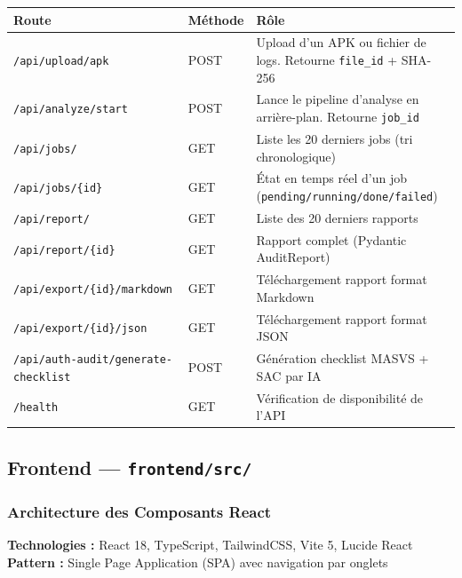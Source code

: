 \documentclass[12pt,a4paper,french]{article}
\newcommand{\file}[1]{\textcolor{primary}{\texttt{#1}}}
\begin{document}
\begin{center}
\renewcommand{\arraystretch}{1.4}
\begin{tabular}{llp{6cm}}
\toprule
\textbf{Route} & \textbf{Méthode} & \textbf{Rôle} \\
\midrule
\rowcolor{primary!5}
\texttt{/api/upload/apk} & POST & Upload d'un APK ou fichier de logs. Retourne \texttt{file\_id} + SHA-256 \\
\texttt{/api/analyze/start} & POST & Lance le pipeline d'analyse en arrière-plan. Retourne \texttt{job\_id} \\
\rowcolor{primary!5}
\texttt{/api/jobs/} & GET & Liste les 20 derniers jobs (tri chronologique) \\
\texttt{/api/jobs/\{id\}} & GET & État en temps réel d'un job (\texttt{pending/running/done/failed}) \\
\rowcolor{primary!5}
\texttt{/api/report/} & GET & Liste des 20 derniers rapports \\
\texttt{/api/report/\{id\}} & GET & Rapport complet (Pydantic AuditReport) \\
\rowcolor{primary!5}
\texttt{/api/export/\{id\}/markdown} & GET & Téléchargement rapport format Markdown \\
\texttt{/api/export/\{id\}/json} & GET & Téléchargement rapport format JSON \\
\rowcolor{primary!5}
\texttt{/api/auth-audit/generate-checklist} & POST & Génération checklist MASVS + SAC par IA \\
\texttt{/health} & GET & Vérification de disponibilité de l'API \\
\bottomrule
\end{tabular}
\end{center}

\subsection{Frontend — \file{frontend/src/}}

\subsubsection{Architecture des Composants React}

\begin{tcolorbox}[toolbox, title={Stack Frontend}]
\textbf{Technologies :} React 18, TypeScript, TailwindCSS, Vite 5, Lucide React\\
\textbf{Pattern :} Single Page Application (SPA) avec navigation par onglets
\end{tcolorbox}
\end{document}
